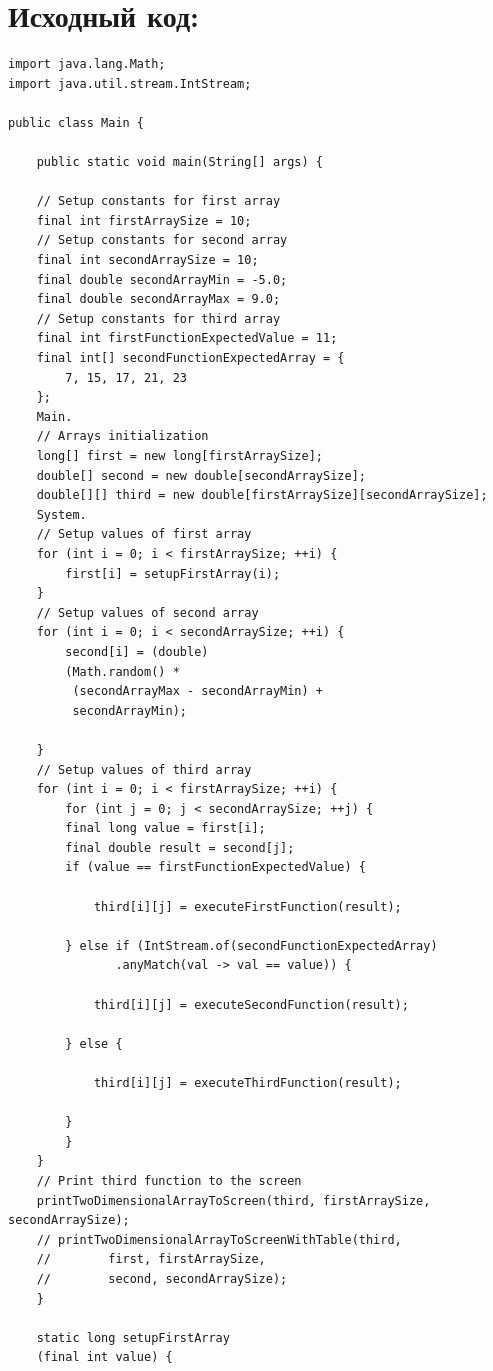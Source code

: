 \documentclass[11pt]{article}
\begin{document}
\section{Исходный код:}
\label{sec:org570de23}
\small
{}
\begin{lstlisting}
import java.lang.Math;
import java.util.stream.IntStream;

public class Main {

    public static void main(String[] args) {

	// Setup constants for first array
	final int firstArraySize = 10;
	// Setup constants for second array
	final int secondArraySize = 10;
	final double secondArrayMin = -5.0;
	final double secondArrayMax = 9.0;
	// Setup constants for third array
	final int firstFunctionExpectedValue = 11;
	final int[] secondFunctionExpectedArray = {
	    7, 15, 17, 21, 23
	};
	Main.
	// Arrays initialization
	long[] first = new long[firstArraySize];
	double[] second = new double[secondArraySize];
	double[][] third = new double[firstArraySize][secondArraySize];
	System.
	// Setup values of first array
	for (int i = 0; i < firstArraySize; ++i) {
	    first[i] = setupFirstArray(i);
	}
	// Setup values of second array
	for (int i = 0; i < secondArraySize; ++i) {
	    second[i] = (double)
		(Math.random() *
		 (secondArrayMax - secondArrayMin) +
		 secondArrayMin);

	}
	// Setup values of third array
	for (int i = 0; i < firstArraySize; ++i) {
	    for (int j = 0; j < secondArraySize; ++j) {
		final long value = first[i];
		final double result = second[j];
		if (value == firstFunctionExpectedValue) {

		    third[i][j] = executeFirstFunction(result);

		} else if (IntStream.of(secondFunctionExpectedArray)
			   .anyMatch(val -> val == value)) {

		    third[i][j] = executeSecondFunction(result);

		} else {

		    third[i][j] = executeThirdFunction(result);

		}
	    }
	}
	// Print third function to the screen
	printTwoDimensionalArrayToScreen(third, firstArraySize, secondArraySize);
	// printTwoDimensionalArrayToScreenWithTable(third,
	// 		  first, firstArraySize,
	// 		  second, secondArraySize);
    }

    static long setupFirstArray
	(final int value) {


\end{lstlisting}
\end{document}
